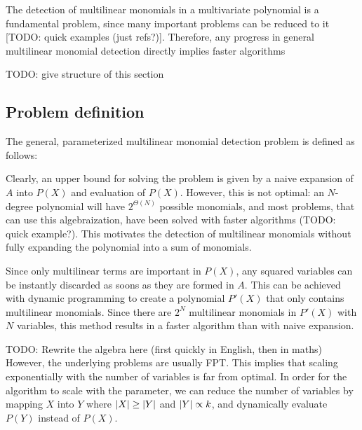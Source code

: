 The detection of multilinear monomials in a multivariate polynomial is a fundamental problem, 
since many important problems can be reduced to it [TODO: quick examples (just refs?)]. 
Therefore, any progress in general multilinear monomial detection directly implies 
faster algorithms

TODO: give structure of this section

\subsection{Problem definition}

The general, parameterized multilinear monomial detection problem is defined as follows: 

\begin{problem}
\end{problem}

Clearly, an upper bound for solving the problem is given by a 
naive expansion of $A$ into $P(X)$ and evaluation of $P(X)$. However, 
this is not optimal: an $N$-degree polynomial will have $2^{\Theta(N)}$ 
possible monomials, and most problems, that can use this algebraization, 
have been solved with faster algorithms (TODO: quick example?). 
This motivates the detection of multilinear monomials 
without fully expanding the polynomial into a sum of monomials.

Since only multilinear terms are important in $P(X)$, 
any squared variables can be instantly discarded as soons as they are formed in $A$. 
This can be achieved with dynamic programming to create a polynomial $P'(X)$ that 
only contains multilinear monomials. Since there are $2^N$ multilinear monomials in $P'(X)$ with 
$N$ variables, this method results in a faster algorithm than with naive expansion.

TODO: Rewrite the algebra here (first quickly in English, then in maths)
However, the underlying problems are usually FPT. This implies that scaling exponentially 
with the number of variables is far from optimal. In order for the algorithm to scale 
with the parameter, we can reduce the number of variables by mapping $X$ into $Y$ where 
${\left\vert X\right\vert} \geq {\left\vert Y\right\vert}$ and ${\left\vert Y\right\vert} \propto k$, and dynamically evaluate $P(Y)$ instead of $P(X)$. 

